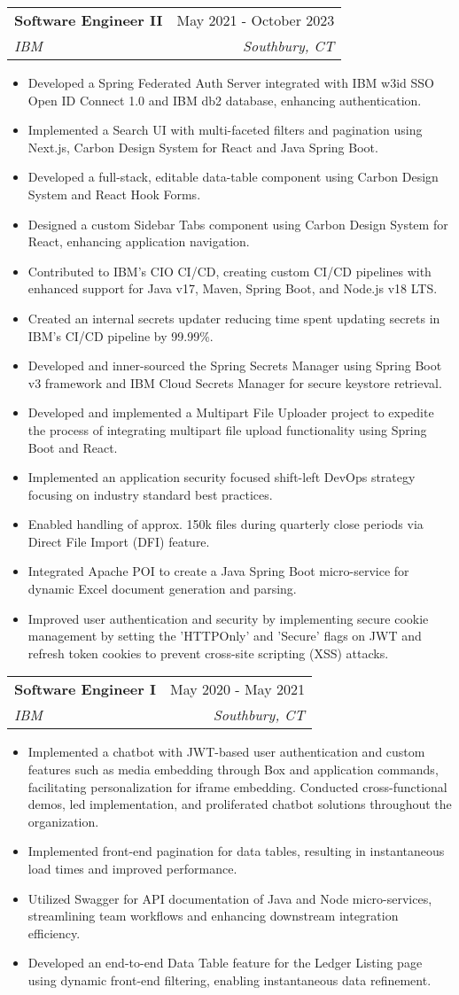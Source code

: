 \documentclass[letterpaper,11pt]{article}
\makeatletter
\newcommand{\resumeItem}[1]{
  \item[-] \small{
    {#1 \vspace{-2pt}}
  }
}
\newcommand{\resumeSubheading}[4]{
  \vspace{-2pt}\item
    \begin{tabular*}{0.97\textwidth}[t]{l@{\extracolsep{\fill}}r}
      \textbf{#1} & #2 \\
      \textit{\small#3} & \textit{\small #4} \\
    \end{tabular*}\vspace{-7pt}
}
\newcommand{\resumeItemListStart}{\begin{itemize}[rightmargin=\dimexpr\linewidth-17.25cm-\leftmargin\relax]}
\newcommand{\resumeItemListEnd}{\end{itemize}\vspace{-5pt}}
\makeatother
\begin{document}
\resumeSubheading
{Software Engineer II}{May 2021 - October 2023}
{IBM}{Southbury, CT}
\resumeItemListStart
\resumeItem{Developed a Spring Federated Auth Server integrated with IBM w3id SSO Open ID Connect 1.0 and IBM db2 database, enhancing authentication.}
\resumeItem{Implemented a Search UI with multi-faceted filters and pagination using Next.js, Carbon Design System for React and Java Spring Boot.}
\resumeItem{Developed a full-stack, editable data-table component using Carbon Design System and React Hook Forms.}
\resumeItem{Designed a custom Sidebar Tabs component using Carbon Design System for React, enhancing application navigation.}
\resumeItem{Contributed to IBM's CIO CI/CD, creating custom CI/CD pipelines with enhanced support for Java v17, Maven, Spring Boot, and Node.js v18 LTS.}
\resumeItem{Created an internal secrets updater reducing time spent updating secrets in IBM's CI/CD pipeline by 99.99\%.}
\resumeItem{Developed and inner-sourced the Spring Secrets Manager using Spring Boot v3 framework and IBM Cloud Secrets Manager for secure keystore retrieval.}
\resumeItem{Developed and implemented a Multipart File Uploader project to expedite the process of integrating multipart file upload functionality using Spring Boot and React.}
\resumeItem{Implemented an application security focused shift-left DevOps strategy focusing on industry standard best practices.}
\resumeItem{Enabled handling of approx. 150k files during quarterly close periods via Direct File Import (DFI) feature.}
\resumeItem{Integrated Apache POI to create a Java Spring Boot micro-service for dynamic Excel document generation and parsing.}
\resumeItem{Improved user authentication and security by implementing secure cookie management by setting the 'HTTPOnly' and 'Secure' flags on JWT and refresh token cookies to prevent cross-site scripting (XSS) attacks.}
\resumeItemListEnd

\resumeSubheading
{Software Engineer I}{May 2020 - May 2021}
{IBM}{Southbury, CT}
\resumeItemListStart
\resumeItem{Implemented a chatbot with JWT-based user authentication and custom features such as media embedding through Box and application commands, facilitating personalization for iframe embedding. Conducted cross-functional demos, led implementation, and proliferated chatbot solutions throughout the organization.}
\resumeItem{Implemented front-end pagination for data tables, resulting in instantaneous load times and improved performance.}
\resumeItem{Utilized Swagger for API documentation of Java and Node micro-services, streamlining team workflows and enhancing downstream integration efficiency.}
\resumeItem{Developed an end-to-end Data Table feature for the Ledger Listing page using dynamic front-end filtering, enabling instantaneous data refinement.}
\resumeItemListEnd
\end{document}

